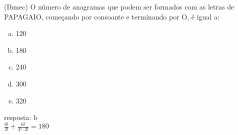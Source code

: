 \begin{ex}
(Ibmec) O número de anagramas que podem ser formados com as letras de PAPAGAIO, começando por consoante e terminando por O, é igual a:
   \begin{enumerate}[(a)]
   \item 120
   \item 180
   \item 240
   \item 300
   \item 320
   \end{enumerate}
     \begin{sol}
      resposta: b \\
      $\frac{6!}{3!}+\frac{6!}{3!\cdot2!}=180$
     \end{sol}
\end{ex}